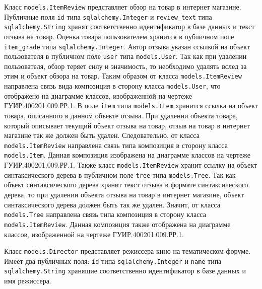 Класс \texttt{models.ItemReview} представляет обзор на товар в интернет магазине. Публичные поля \texttt{id} типа \texttt{sqlalchemy.Integer} и \texttt{review\_text} типа \texttt{sqlalchemy.String} хранят соответственно идентификатор в базе данных и текст отзыва на товар. Оценка товара пользователем хранится в публичном поле \texttt{item\_grade} типа \texttt{sqlalchemy.Integer}. Автор отзыва указан ссылкой на объект пользователя в публичном поле \texttt{user} типа \texttt{models.User}. Так как при удалении пользователя, обзор теряет силу и значимость, то необходимо удалять вслед за этим и объект обзора на товар. Таким образом от класса \texttt{models.ItemReview} направлена связь вида композиция в сторону класса \texttt{models.User}, что отображено на диаграмме классов, изображенной на чертеже ГУИР.400201.009.РР.1. В поле \texttt{item} типа \texttt{models.Item} хранится ссылка на объект товара, описанного в данном объекте отзыва. При удалении объекта товара, который описывает текущий объект отзыва на товар, отзыв на товар в интернет магазине так же должен быть удален. Следовательно, от класса \texttt{models.ItemReview} направлена связь типа композиция в сторону класса \texttt{models.Item}. Данная композиция изображена на диаграмме классов на чертеже ГУИР.400201.009.РР.1. Также класс \texttt{models.ItemReview} хранит ссылку на объект синтаксического дерева в публичном поле \texttt{tree} типа \texttt{models.Tree}. Так как объект синтаксического дерева хранит текст отзыва в формате синтаксического дерева, то при удалении объекта отзыва на товар в интернет магазине, объект синтаксического дерева должен быть так же удален. Значит, от класса \texttt{models.Tree} направлена связь типа композиция в сторону класса \texttt{models.ItemReview}. Данная композиция также отображена на диаграмме классов, изображенной на чертеже ГУИР.400201.009.РР.1.

Класс \texttt{models.Director} представляет режиссера кино на тематическом форуме. Имеет два публичных поля: \texttt{id} типа \texttt{sqlalchemy.Integer} и \texttt{name} типа \texttt{sqlalchemy.String} хранящие соответственно идентификатор в базе данных и имя режиссера.


